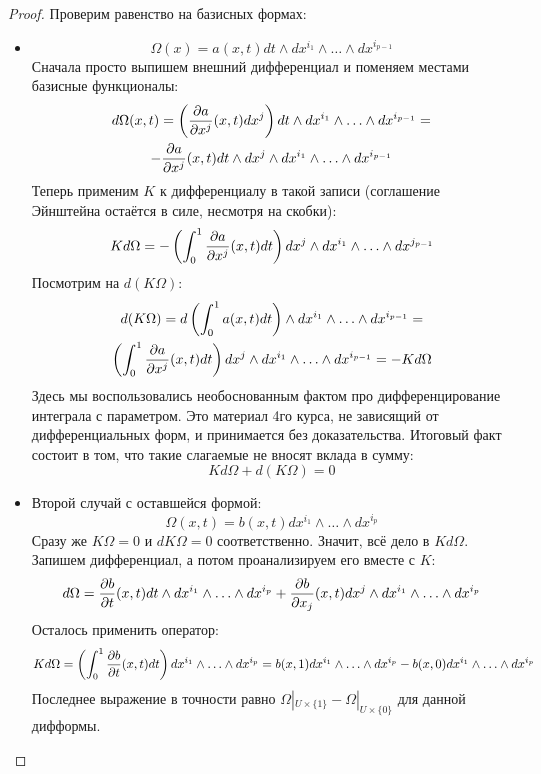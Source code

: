 \begin{proof}
	Проверим равенство на базисных формах:
	\begin{itemize}
		\item \[
			\Omega(x) = a(x, t) dt \wedge dx^{i_1} \wedge \ldots \wedge dx^{i_{p - 1}}
		\]
		Сначала просто выпишем внешний дифференциал и поменяем местами базисные функционалы:
		\begin{multline*}
			d\Omega(x, t) = \left(\frac{\partial a}{\partial x^j}(x, t) dx^{j}\right) dt \wedge dx^{i_1} \wedge \ldots \wedge dx^{i_{p - 1}} =
			\\
			-\frac{\partial a}{\partial x^j}(x, t) dt \wedge dx^j \wedge dx^{i_1} \wedge \ldots \wedge dx^{i_{p - 1}}
		\end{multline*}
		Теперь применим $K$ к дифференциалу в такой записи (соглашение Эйнштейна остаётся в силе, несмотря на скобки):
		\[
			Kd\Omega = -\left(\int_0^1 \frac{\partial a}{\partial x^j}(x, t)dt\right) dx^j \wedge dx^{i_1} \wedge \ldots \wedge dx^{j_{p - 1}}
		\]
		Посмотрим на $d(K\Omega)$:
		\begin{multline*}
			d(K\Omega) = d\left(\int_0^1 a(x, t) dt\right) \wedge dx^{i_1} \wedge \ldots \wedge dx^{i_{p - 1}} =
			\\
			\left(\int_0^1 \frac{\partial a}{\partial x^j}(x, t) dt\right) dx^j \wedge dx^{i_1} \wedge \ldots \wedge dx^{i_{p - 1}} = -Kd\Omega
		\end{multline*}
		Здесь мы воспользовались необоснованным фактом про дифференцирование интеграла с параметром. Это материал 4го курса, не зависящий от дифференциальных форм, и принимается без доказательства. Итоговый факт состоит в том, что такие слагаемые не вносят вклада в сумму:
		\[
			Kd\Omega + d(K\Omega) = 0
		\]
		
		\item Второй случай с оставшейся формой:
		\[
			\Omega(x, t) = b(x, t)dx^{i_1} \wedge \ldots \wedge dx^{i_p}
		\]
		Сразу же $K\Omega = 0$ и $dK\Omega = 0$ соответственно. Значит, всё дело в $Kd\Omega$. Запишем дифференциал, а потом проанализируем его вместе с $K$:
		\[
			d\Omega = \frac{\partial b}{\partial t}(x, t) dt \wedge dx^{i_1} \wedge \ldots \wedge dx^{i_p} + \frac{\partial b}{\partial x_j}(x, t) dx^j \wedge dx^{i_1} \wedge \ldots \wedge dx^{i_p}
		\]
		Осталось применить оператор:
		\[
			Kd\Omega = \left(\int_0^1 \frac{\partial b}{\partial t}(x, t)dt\right) dx^{i_1} \wedge \ldots \wedge dx^{i_p} = b(x, 1)dx^{i_1} \wedge \ldots \wedge dx^{i_p} - b(x, 0)dx^{i_1} \wedge \ldots \wedge dx^{i_p}
		\]
		Последнее выражение в точности равно $\Omega|_{U \times \{1\}} - \Omega|_{U \times \{0\}}$ для данной дифформы.
	\end{itemize}
\end{proof}

